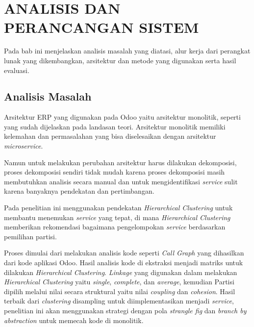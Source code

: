 \chapter{ANALISIS DAN PERANCANGAN SISTEM}
\vspace{4.5pt}

Pada bab ini menjelaskan analisis masalah yang diatasi, alur kerja dari perangkat lunak yang dikembangkan, arsitektur dan metode yang digunakan serta hasil evaluasi.\\

\section{Analisis Masalah}
Arsitektur ERP yang digunakan pada Odoo yaitu arsitektur monolitik, seperti yang sudah dijelaskan pada landasan teori. Arsitektur monolitik memiliki kelemahan dan permasalahan yang bisa diselesaikan dengan arsitektur \textit{microservice}.

Namun untuk melakukan perubahan arsitektur harus dilakukan dekomposisi, proses dekomposisi sendiri tidak mudah karena proses dekomposisi masih membutuhkan analisis secara manual dan untuk mengidentifikasi \textit{service} sulit karena banyaknya pendekatan dan pertimbangan.

Pada penelitian ini menggunakan pendekatan \textit{Hierarchical Clustering} untuk membantu menemukan \textit{service} yang tepat, di mana \textit{Hierarchical Clustering} memberikan rekomendasi bagaimana pengelompokan \textit{service} berdasarkan pemilihan partisi.

Proses dimulai dari melakukan analisis kode seperti \textit{Call Graph} yang dihasilkan dari kode aplikasi Odoo. Hasil analisis kode di ekstraksi menjadi matriks untuk dilakukan \textit{Hierarchical Clustering}. \textit{Linkage} yang digunakan dalam melakukan \textit{Hierarchical Clustering} yaitu \textit{single}, \textit{complete}, dan \textit{average}, kemudian  Partisi  dipilih melalui nilai secara struktural yaitu nilai \textit{coupling}  dan \textit{cohesion}. Hasil terbaik dari \textit{clustering} disampling untuk diimplementasikan menjadi \textit{service}, penelitian ini akan menggunakan strategi dengan pola \textit{strangle fig } dan \textit{branch by abstraction} untuk memecah kode di monolitik.

